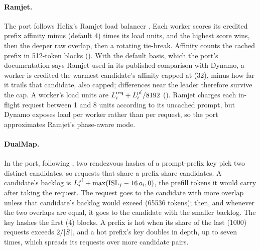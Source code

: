 \paragraph{Ramjet.}
The  port follows Helix's Ramjet load balancer \citep{ramjet}. Each worker scores
its credited prefix affinity minus  (default 4) times its load units, and the highest
score wins, then the deeper raw overlap, then a rotating tie-break. Affinity counts the cached
prefix in 512-token blocks (). With the default  basis,
which the port's documentation says Ramjet used in its published comparison with Dynamo, a worker is
credited the warmest candidate's affinity capped at  (32), minus how far
it trails that candidate, also capped; differences near the leader therefore survive the cap. A
worker's load units are $L^{\mathrm{req}}_i + L^{\mathrm{pf}}_i/8192$ (). Ramjet charges each
in-flight request between 1 and 8 units according to its uncached prompt, but Dynamo exposes load
per worker rather than per request, so the port approximates Ramjet's phase-aware mode.

\paragraph{DualMap.}
In the  port, following \citet{yuan2026dualmap}, two rendezvous hashes of a
prompt-prefix key pick two distinct candidates, so requests that share a prefix share candidates.
A candidate's backlog is $L^{\mathrm{pf}}_i + \max(\mathrm{ISL}_j - 16\,o_i, 0)$, the prefill tokens it would carry
after taking the request. The request goes to the candidate with more overlap unless that
candidate's backlog would exceed  (\num{65536} tokens); then,
and whenever the two overlaps are equal, it goes to the candidate with the smaller backlog. The key
hashes the first  (4) blocks. A prefix is hot when its share of the last
 (1000) requests exceeds $2/|S|$, and a hot prefix's key doubles in depth,
up to seven times, which spreads its requests over more candidate pairs.

